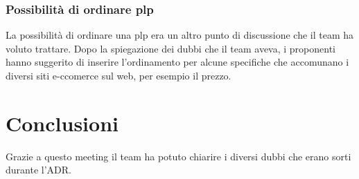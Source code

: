 \subsubsection{Possibilità di ordinare plp}
La possibilità di ordinare una plp era un altro punto di discussione che il team ha voluto trattare. Dopo la spiegazione dei dubbi che il team aveva, i proponenti hanno suggerito di inserire l'ordinamento per alcune specifiche che accomunano i diversi siti e-ccomerce sul web, per esempio il prezzo.


\section{Conclusioni}
Grazie a questo meeting il team ha potuto chiarire i diversi dubbi che erano sorti durante l'ADR.